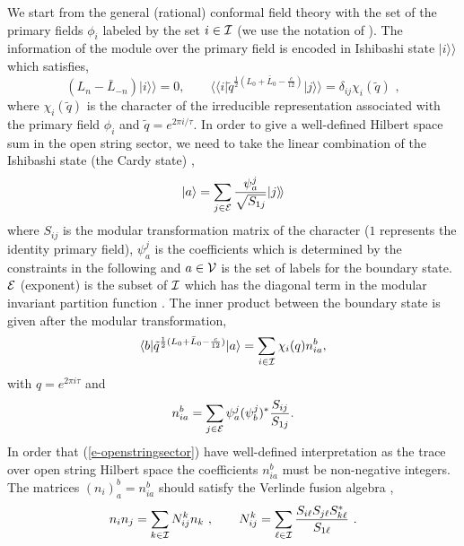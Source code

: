 \documentclass[a4paper,12pt]{article}
\begin{document}
We start from the general (rational) conformal field theory
with the set of the primary fields $\phi_i$ labeled by the set 
$i\in\cal I$ (we use the notation of \cite{r-BPPZ}).
The information of the module over the primary field
is encoded in
Ishibashi state \cite{r-Ishibashi}$|i\rangle\!\rangle$
which satisfies,
\begin{equation}
 (L_n-\bar L_{-n})|i\rangle\!\rangle=0,
\qquad
 \langle\!\langle i| \tilde q^{\frac{1}{2}(L_0+\bar L_0 -\frac{c}{12})}
|j\rangle\!\rangle
= \delta_{ij}\chi_i(\tilde q)\,\,,
\end{equation}
where $\chi_i(\tilde q)$ is the character of the irreducible
representation associated with the primary field $\phi_i$
and $\tilde q=e^{2\pi i/\tau}$.  In order to give a well-defined 
Hilbert space sum in the open string sector, we need to take
the linear combination of the Ishibashi state (the Cardy state)
\cite{r-Cardy},
\begin{equation}\label{e-Cardy}
 |a\rangle =\sum_{j\in {\cal E}} \frac{\psi^j_a}{\sqrt{S_{1j}}}
 |j\rangle\!\rangle
\end{equation}
where $S_{ij}$ is the modular transformation matrix of the
character ($1$ represents the identity primary field),
$\psi^j_a$ is the coefficients which is determined by the
constraints in the following and $a\in {\cal V}$ is
the set of labels for the boundary state.
${\cal E}$ (exponent) is the subset of ${\cal I}$ 
which has the diagonal term in the modular invariant partition
function \cite{r-BPPZ}.
The inner product between the boundary state is given 
after the modular transformation,
\begin{equation}\label{e-openstringsector}
 \langle b | \tilde q^{\frac{1}{2}(L_0+\bar L_0-\frac{c}{12})}
|a\rangle =\sum_{i\in{\cal I}} \chi_i(q)n_{ia}^b,
\end{equation}
with $q=e^{2\pi i\tau}$ and
\begin{equation}
 n_{ia}^b=\sum_{j\in \cal E} \psi^j_a (\psi^j_b)^* 
\frac{S_{ij}}{S_{1j}}.
\end{equation}
In order that (\ref{e-openstringsector}) have 
well-defined interpretation as the trace over open string
Hilbert space the coefficients $n_{ia}^b$ must be
non-negative integers.  
The matrices $(n_i)_a^b= n_{ia}^b$ 
should satisfy the Verlinde fusion algebra \cite{r-Verlinde},
\begin{equation}
 n_i n_j = \sum_{k\in\cal I} N_{ij}^k n_k\,\,,
\qquad
N_{ij}^k=\sum_{\ell\in \cal I}\frac{S_{i\ell}
S_{j\ell}S_{k\ell}^*}{S_{1\ell}}\,\,.
\end{equation}
\end{document}
